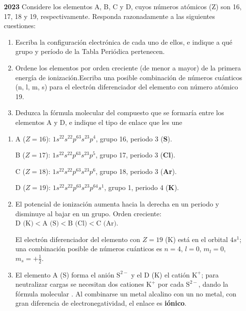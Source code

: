 \begin{exerciseEVAU}
    \textbf{2023} Considere los elementos A, B, C y D, cuyos números atómicos (Z) son 16, 17, 18 y 19, respectivamente. Responda razonadamente a las siguientes cuestiones:

    \begin{enumerate}[label=\letraminuscula]
        \item Escriba la configuración electrónica de cada uno de ellos, e indique a qué grupo y período de
        la Tabla Periódica pertenecen.
        \item Ordene los elementos por orden creciente (de menor a mayor) de la primera energía de
        ionización.Escriba una posible combinación de números cuánticos (n, l, m, s) para el electrón
        diferenciador del elemento con número atómico 19.
        \item Deduzca la fórmula molecular del compuesto que se formaría entre los elementos A y D, e
        indique el tipo de enlace que les une
    \end{enumerate}

    \begin{solu}


        \begin{enumerate}[label=\letraminuscula]
            \item A (\(Z=16\)): \(1s^22s^22p^63s^23p^4\), grupo 16, periodo 3 (\textbf{S}).

            B (\(Z=17\)): \(1s^22s^22p^63s^23p^5\), grupo 17, periodo 3 (\textbf{Cl}).

            C (\(Z=18\)): \(1s^22s^22p^63s^23p^6\), grupo 18, periodo 3 (\textbf{Ar}).

            D (\(Z=19\)): \(1s^22s^22p^63s^23p^64s^1\), grupo 1, periodo 4 (\textbf{K}).

            \item El potencial de ionización aumenta hacia la derecha en un periodo y disminuye al bajar en un grupo. Orden creciente: \(\text{D (K)} < \text{A (S)} < \text{B (Cl)} < \text{C (Ar)}\).

            El electrón diferenciador del elemento con \(Z=19\) (K) está en el orbital \(4s^1\); una combinación posible de números cuánticos es \(n=4\), \(l=0\), \(m_l=0\), \(m_s=+\tfrac{1}{2}\).

            \item El elemento A (S) forma el anión \(\text{S}^{2-}\) y el D (K) el catión \(\text{K}^+\); para neutralizar cargas se necesitan dos cationes \(\text{K}^+\) por cada \(\text{S}^{2-}\), dando la fórmula molecular \textbf{}. Al combinarse un metal alcalino con un no metal, con gran diferencia de electronegatividad, el enlace es \textbf{iónico}.
        \end{enumerate}
    \end{solu}
\end{exerciseEVAU}


